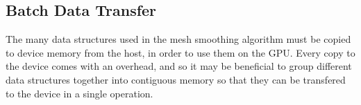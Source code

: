 \subsection*{Batch Data Transfer}
The many data structures used in the mesh smoothing algorithm must be copied to device memory from the host, in order to use them on the GPU. Every copy to the device comes with an overhead\cite{transfer}, and so it may be beneficial to group different data structures together into contiguous memory so that they can be transfered to the device in a single operation.